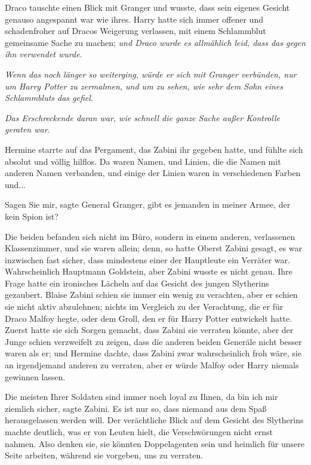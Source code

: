 Draco tauschte einen Blick mit Granger und wusste, dass sein eigenes Gesicht
genauso angespannt war wie ihres. Harry hatte sich immer offener und
schadenfroher auf Dracos Weigerung verlassen, mit einem Schlammblut gemeinsame
Sache zu machen; \emph{und Draco wurde es allmählich leid, dass das gegen ihn
verwendet wurde.}

\emph{Wenn das noch länger so weiterging, würde er sich mit Granger verbünden,
nur um Harry Potter zu zermalmen, und um zu sehen, wie sehr dem Sohn eines
Schlammbluts das gefiel.}

\emph{Das Erschreckende daran war, wie schnell die ganze Sache außer Kontrolle
geraten war.}

Hermine starrte auf das Pergament, das Zabini ihr gegeben hatte, und fühlte sich
absolut und völlig hilflos. Da waren Namen, und Linien, die die Namen mit
anderen Namen verbanden, und einige der Linien waren in verschiedenen Farben
und...

\glqq{}Sagen Sie mir\grqq{}, sagte General Granger, \glqq{}gibt es jemanden in
meiner Armee, der kein Spion ist?\grqq{}

Die beiden befanden sich nicht im Büro, sondern in einem anderen, verlassenen
Klassenzimmer, und sie waren allein; denn, so hatte Oberst Zabini gesagt, es war
inzwischen fast sicher, dass mindestens einer der Hauptleute ein Verräter war.
Wahrscheinlich Hauptmann Goldstein, aber Zabini wusste es nicht genau. Ihre
Frage hatte ein ironisches Lächeln auf das Gesicht des jungen Slytherins
gezaubert. Blaise Zabini schien sie immer ein wenig zu verachten, aber er schien
sie nicht aktiv abzulehnen; nichts im Vergleich zu der Verachtung, die er für
Draco Malfoy hegte, oder dem Groll, den er für Harry Potter entwickelt hatte.
Zuerst hatte sie sich Sorgen gemacht, dass Zabini sie verraten könnte, aber der
Junge schien verzweifelt zu zeigen, dass die anderen beiden Generäle nicht
besser waren als er; und Hermine dachte, dass Zabini zwar wahrscheinlich froh
wäre, sie an irgendjemand anderen zu verraten, aber er würde Malfoy oder Harry
niemals gewinnen lassen.

\glqq{}Die meisten Ihrer Soldaten sind immer noch loyal zu Ihnen, da bin ich mir
ziemlich sicher\grqq{}, sagte Zabini. \glqq{}Es ist nur so, dass niemand aus dem
Spaß herausgelassen werden will.\grqq{} Der verächtliche Blick auf dem Gesicht
des Slytherins machte deutlich, was er von Leuten hielt, die Verschwörungen
nicht ernst nahmen. \glqq{}Also denken sie, sie könnten Doppelagenten sein und
heimlich für unsere Seite arbeiten, während sie vorgeben, uns zu verraten.\grqq{}

